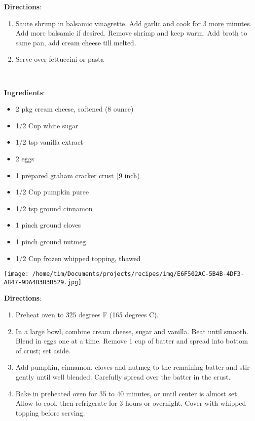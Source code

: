 \documentclass[11pt, twoside, openany]{book}
\begin{document}
\textbf{Directions}:
\vspace{-3mm}\begin{enumerate}\setlength\itemsep{-1mm}
\item Saute shrimp in balsamic vinagrette. Add garlic and cook for 3 more minutes. Add more balsamic if desired. Remove shrimp and keep warm. Add broth to same pan, add cream cheese till melted.
\item Serve over fettuccini or pasta
\end{enumerate}
 \label{double-layer-pumpkin-cheesecake}\hfill\textit{}\\
\begin{minipage}[t]{0.8\linewidth}
\textbf{Ingredients}:\vspace{-3mm}
\begin{multicols}{2}
\begin{itemize}\setlength\itemsep{-1mm}
\item 2 pkg cream cheese, softened (8 ounce)
\item 1/2 Cup white sugar
\item 1/2 tsp vanilla extract
\item 2 eggs
\item 1 prepared graham cracker crust (9 inch)
\item 1/2 Cup pumpkin puree
\item 1/2 tsp ground cinnamon
\item 1 pinch ground cloves
\item 1 pinch ground nutmeg
\item 1/2 Cup frozen whipped topping, thawed
\end{itemize}
\end{multicols}
\end{minipage}
\begin{minipage}[t]{0.2\linewidth}
\centering \strut\vspace*{-\baselineskip}\newline
\texttt{[image: /home/tim/Documents/projects/recipes/img/E6F502AC-5B4B-4DF3-A847-9DA4B3B3B529.jpg]}\\
\end{minipage}\vspace{3mm}
\textbf{Directions}:
\vspace{-3mm}\begin{enumerate}\setlength\itemsep{-1mm}
\item Preheat oven to 325 degrees F (165 degrees C).
\item In a large bowl, combine cream cheese, sugar and vanilla. Beat until smooth. Blend in eggs one at a time. Remove 1 cup of batter and spread into bottom of crust; set aside.
\item Add pumpkin, cinnamon, cloves and nutmeg to the remaining batter and stir gently until well blended. Carefully spread over the batter in the crust.
\item Bake in preheated oven for 35 to 40 minutes, or until center is almost set. Allow to cool, then refrigerate for 3 hours or overnight. Cover with whipped topping before serving.
\end{enumerate}
\end{document}
